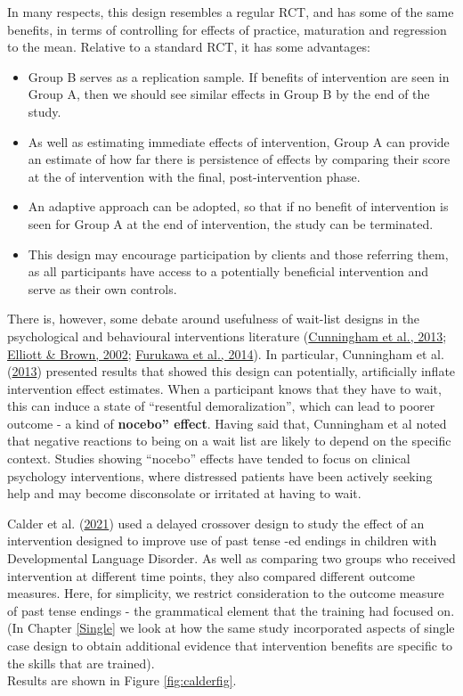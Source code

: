 \documentclass{krantz}
\providecommand{\tightlist}{%
\setlength{\itemsep}{0pt}\setlength{\parskip}{0pt}}
\begin{document}
In many respects, this design resembles a regular RCT, and has some of the same benefits, in terms of controlling for effects of practice, maturation and regression to the mean. Relative to a standard RCT, it has some advantages:

\begin{itemize}
\tightlist
\item
  Group B serves as a replication sample. If benefits of intervention are seen in Group A, then we should see similar effects in Group B by the end of the study.\\
\item
  As well as estimating immediate effects of intervention, Group A can provide an estimate of how far there is persistence of effects by comparing their score at the of intervention with the final, post-intervention phase.\\
\item
  An adaptive approach can be adopted, so that if no benefit of intervention is seen for Group A at the end of intervention, the study can be terminated.\\
\item
  This design may encourage participation by clients and those referring them, as all participants have access to a potentially beneficial intervention and serve as their own controls.
\end{itemize}

There is, however, some debate around usefulness of wait-list designs in the psychological and behavioural interventions literature (\protect\hyperlink{ref-cunningham2013}{Cunningham et al., 2013}; \protect\hyperlink{ref-elliott2002}{Elliott \& Brown, 2002}; \protect\hyperlink{ref-furukawa2014}{Furukawa et al., 2014}). In particular, Cunningham et al. (\protect\hyperlink{ref-cunningham2013}{2013}) presented results that showed this design can potentially, artificially inflate intervention effect estimates. When a participant knows that they have to wait, this can induce a state of ``resentful demoralization'', which can lead to poorer outcome - a kind of \textbf{nocebo'' effect}. Having said that, Cunningham et al noted that negative reactions to being on a wait list are likely to depend on the specific context. Studies showing ``nocebo'' effects have tended to focus on clinical psychology interventions, where distressed patients have been actively seeking help and may become disconsolate or irritated at having to wait.

Calder et al. (\protect\hyperlink{ref-calder2021}{2021}) used a delayed crossover design to study the effect of an intervention designed to improve use of past tense -ed endings in children with Developmental Language Disorder. As well as comparing two groups who received intervention at different time points, they also compared different outcome measures. Here, for simplicity, we restrict consideration to the outcome measure of past tense endings - the grammatical element that the training had focused on. (In Chapter \ref{Single} we look at how the same study incorporated aspects of single case design to obtain additional evidence that intervention benefits are specific to the skills that are trained).\\
Results are shown in Figure \ref{fig:calderfig}.
\end{document}
